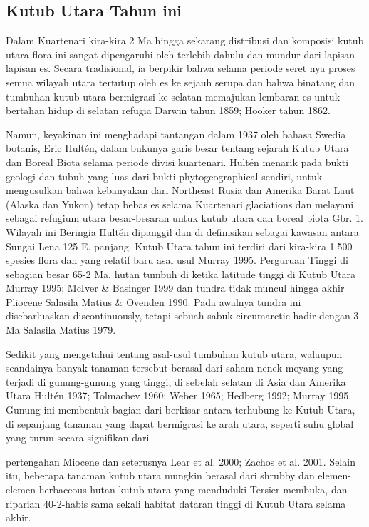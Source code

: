 \subsection{Kutub Utara Tahun ini}

		Dalam Kuartenari {kira-kira 2 Ma hingga sekarang} distribusi dan komposisi kutub utara flora ini sangat dipengaruhi oleh terlebih dahulu dan mundur dari 
	lapisan-lapisan es. Secara tradisional, ia berpikir bahwa selama periode seret nya proses semua wilayah utara tertutup oleh es ke sejauh serupa dan bahwa
	binatang dan tumbuhan kutub utara bermigrasi ke selatan memajukan lembaran-es untuk bertahan hidup di selatan refugia {Darwin tahun 1859; Hooker tahun 1862}.

	Namun, keyakinan ini menghadapi tantangan dalam 1937 oleh bahasa Swedia botanis, Eric Hultén, dalam bukunya garis besar tentang sejarah Kutub Utara dan 
	Boreal Biota selama periode divisi kuartenari. Hultén menarik pada bukti geologi dan tubuh yang luas dari bukti phytogeographical sendiri, untuk mengusulkan
	bahwa kebanyakan dari Northeast Rusia dan Amerika Barat Laut (Alaska dan Yukon) tetap bebas es selama Kuartenari glaciations dan melayani sebagai refugium 
	utara besar-besaran untuk kutub utara dan boreal biota {Gbr. 1}. Wilayah ini Beringia Hultén dipanggil dan di definisikan sebagai kawasan antara Sungai Lena 
	{125 E. panjang.}
		Kutub Utara tahun ini terdiri dari kira-kira 1.500 spesies flora dan yang relatif baru asal usul {Murray 1995}. Perguruan Tinggi di sebagian besar {65-2 Ma}, 
	hutan tumbuh di ketika latitude tinggi di Kutub Utara {Murray 1995; McIver \& Basinger 1999} dan tundra tidak muncul hingga akhir Pliocene {Salasila Matius \& Ovenden 1990}.
	Pada awalnya tundra ini disebarluaskan discontinuously, tetapi sebuah sabuk circumarctic hadir dengan 3 Ma {Salasila Matius 1979}. 

	Sedikit yang mengetahui tentang asal-usul tumbuhan kutub utara, walaupun seandainya banyak tanaman tersebut berasal dari saham nenek moyang yang terjadi di gunung-gunung yang tinggi, di sebelah selatan di Asia dan Amerika Utara {Hultén 1937; Tolmachev 1960; Weber 1965; Hedberg 1992; Murray 1995}. Gunung ini membentuk 
	bagian dari berkisar antara terhubung ke Kutub Utara, di sepanjang tanaman yang dapat bermigrasi ke arah utara, seperti suhu global yang turun secara signifikan dari 

	pertengahan Miocene dan seterusnya {Lear et al. 2000; Zachos et al. 2001}. Selain itu, beberapa tanaman kutub utara mungkin berasal dari shrubby dan elemen-elemen 
	herbaceous hutan kutub utara yang menduduki Tersier membuka, dan riparian {40-2}-habis sama sekali habitat dataran tinggi di Kutub Utara selama akhir.
	
